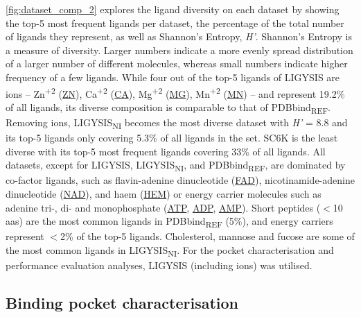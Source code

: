 \autoref{fig:dataset_comp_2} explores the ligand diversity on each dataset by showing the top-5 most frequent ligands per dataset, the percentage of the total number of ligands they represent, as well as Shannon's Entropy, \textit{H'}. Shannon's Entropy is a measure of diversity. Larger numbers indicate a more evenly spread distribution of a larger number of different molecules, whereas small numbers indicate higher frequency of a few ligands. While four out of the top-5 ligands of LIGYSIS are ions -- Zn\textsuperscript{+2} (\href{https://www.ebi.ac.uk/pdbe-srv/pdbechem/chemicalCompound/show/ZN}{ZN}), Ca\textsuperscript{+2} (\href{https://www.ebi.ac.uk/pdbe-srv/pdbechem/chemicalCompound/show/CA}{CA}), Mg\textsuperscript{+2} (\href{https://www.ebi.ac.uk/pdbe-srv/pdbechem/chemicalCompound/show/MG}{MG}), Mn\textsuperscript{+2} (\href{https://www.ebi.ac.uk/pdbe-srv/pdbechem/chemicalCompound/show/MN}{MN}) -- and represent 19.2\% of all ligands, its diverse composition is comparable to that of PDBbind\textsubscript{REF}. Removing ions, LIGYSIS\textsubscript{NI} becomes the most diverse dataset with \textit{H'} = 8.8 and its top-5 ligands only covering 5.3\% of all ligands in the set. SC6K is the least diverse with its top-5 most frequent ligands covering 33\% of all ligands. All datasets, except for LIGYSIS, LIGYSIS\textsubscript{NI}, and PDBbind\textsubscript{REF}, are dominated by co-factor ligands, such as flavin-adenine dinucleotide (\href{https://www.ebi.ac.uk/pdbe-srv/pdbechem/chemicalCompound/show/FAD}{FAD}), nicotinamide-adenine dinucleotide (\href{https://www.ebi.ac.uk/pdbe-srv/pdbechem/chemicalCompound/show/NAD}{NAD}), and haem (\href{https://www.ebi.ac.uk/pdbe-srv/pdbechem/chemicalCompound/show/HEM}{HEM}) or energy carrier molecules such as adenine tri-, di- and monophosphate (\href{https://www.ebi.ac.uk/pdbe-srv/pdbechem/chemicalCompound/show/ATP}{ATP}, \href{https://www.ebi.ac.uk/pdbe-srv/pdbechem/chemicalCompound/show/ADP}{ADP}, \href{https://www.ebi.ac.uk/pdbe-srv/pdbechem/chemicalCompound/show/AMP}{AMP}). Short peptides ($<$10 aas) are the most common ligands in PDBbind\textsubscript{REF} (5\%), and energy carriers represent $<$2\% of the top-5 ligands. Cholesterol, mannose and fucose are some of the most common ligands in LIGYSIS\textsubscript{NI}. For the pocket characterisation and performance evaluation analyses, LIGYSIS (including ions) was utilised.

\subsection{Binding pocket characterisation}

